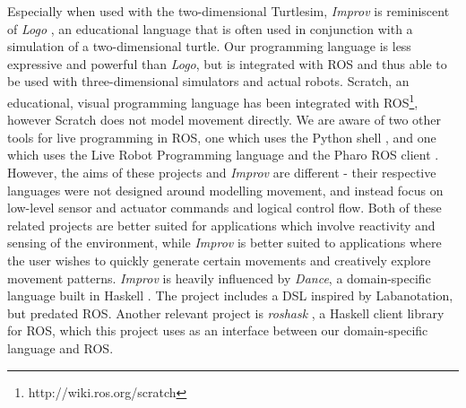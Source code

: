 \documentclass[sigchi-a]{acmart}
\begin{document}
Especially when used with the two-dimensional Turtlesim, \emph{Improv}
is reminiscent of \emph{Logo} \cite{logo}, an educational language that is often used in conjunction with a simulation of a
two-dimensional turtle. Our programming language is less expressive and powerful 
than \emph{Logo}, but is integrated with ROS and thus able to be used with
three-dimensional simulators and actual robots. Scratch, an educational, visual
programming language has been integrated
with ROS\footnote{http://wiki.ros.org/scratch}, however Scratch does not 
model movement directly.
We are aware of two other tools for live
programming in ROS, one which uses the Python shell \cite{python_live_DSLRob}, and one
which uses the Live Robot Programming language and the Pharo ROS client 
\cite{campusano2017live} \cite{estefo2014towards}.
However, the aims of these projects and \emph{Improv} are different - their 
respective languages were not designed
around modelling movement, and instead focus on low-level sensor and
actuator commands and logical control flow. Both of these related projects are better suited for
applications which involve reactivity and sensing of the environment, while
\emph{Improv} is better suited to applications where the user wishes to quickly
generate certain movements and creatively explore movement patterns.
\emph{Improv} is heavily influenced by \emph{Dance}, a
domain-specific language built in Haskell \cite{Dance2003}. The project includes
a DSL inspired by Labanotation, but predated ROS. Another relevant project is
\emph{roshask} \cite{cowley2011stream}, a Haskell client library for ROS, which
this project uses as an interface between our domain-specific language and ROS.

%
%
\end{document}
